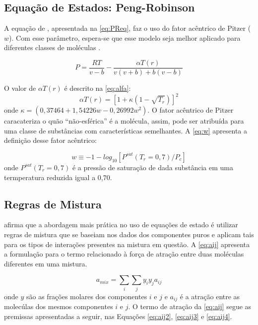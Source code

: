 \subsection{Equação de Estados: Peng-Robinson}

 A equação de , apresentada na
 \autoref{eq:PReq}, faz o uso do fator acêntrico de Pitzer ($w$). Com esse 
 parâmetro, espera-se que esse modelo seja melhor aplicado para diferentes classes
 de moléculas \cite{Koretsky2013}.
      
\begin{equation}\label{eq:PReq}
P = \frac{RT}{v - b} - \frac{\alpha T(r)}{v(v+b)+b(v-b)}
\end{equation} 

O valor de $\alpha T(r)$ é descrito na \autoref{eq:alfa}:
 \begin{equation}\label{eq:alfa}
\alpha T(r) = [1 +
 \kappa(1-\sqrt{T_r})]^2
\end{equation} 
onde $\kappa = (0,37464+1,54226w-0,26992w^2)$. 
 O fator acêntrico de Pitzer caracateriza o quão ``não-esférica'' é a molécula,
 assim, pode ser atribuída para uma classe de substâncias com
 características semelhantes. A \autoref{eq:w} apresenta a definição desse fator
 acêntrico:
 
  \begin{equation}\label{eq:w}
w \equiv -1 - log_{10}\left [ P^{sat} \left ( T_r = 0,7 \right )/P_c \right ]
\end{equation} 
onde $ P^{sat} \left ( T_r = 0,7 \right )$ é a pressão de saturação de dada
substância em uma termperatura reduzida igual a 0,70.

\subsection{Regras de Mistura}

 afirma que a abordagem mais prática no uso de equações de estado
é utilizar regras de mistura que se baseiam nos dados dos componentes puros e 
aplicam tais para os tipos de interações presentes na mistura em questão. A 
\autoref{eq:aij} apresenta a formulação para o termo relacionado à força de
atração entre duas moléculas diferentes em uma mistura.

\begin{equation}\label{eq:aij}
a_{mix} = \sum_i\sum_jy_iy_ja_{ij}
\end{equation}
onde $y$ são as frações molares dos componentes $i$ e $j$ e $a_{ij}$ é a
atração entre as molecúlas dos mesmos componentes $i$ e $j$. O termo de atração
da \autoref{eq:aij} segue as premissas apresentadas a seguir, nas Equações
\ref{eq:aij2}, \ref{eq:aij3} e \ref{eq:aij4}. 

